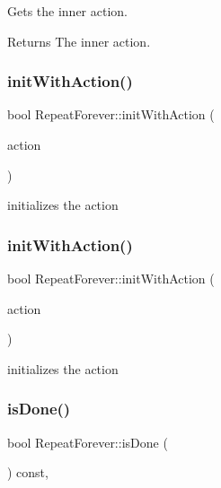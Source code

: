 Gets the inner action.

\begin{DoxyReturn}{Returns}
The inner action. 
\end{DoxyReturn}
\mbox{\label{classRepeatForever_a43be589f168fffe1fb2868ab92c44c5d}} 
\subsubsection{\texorpdfstring{init\+With\+Action()}{initWithAction()}\hspace{0.1cm}{\footnotesize\ttfamily [1/2]}}
{\footnotesize\ttfamily bool Repeat\+Forever\+::init\+With\+Action (\begin{DoxyParamCaption}\item[{\hyperlink{classActionInterval}{Action\+Interval} $\ast$}]{action }\end{DoxyParamCaption})}

initializes the action \mbox{\label{classRepeatForever_a43be589f168fffe1fb2868ab92c44c5d}} 
\subsubsection{\texorpdfstring{init\+With\+Action()}{initWithAction()}\hspace{0.1cm}{\footnotesize\ttfamily [2/2]}}
{\footnotesize\ttfamily bool Repeat\+Forever\+::init\+With\+Action (\begin{DoxyParamCaption}\item[{\hyperlink{classActionInterval}{Action\+Interval} $\ast$}]{action }\end{DoxyParamCaption})}

initializes the action \mbox{\label{classRepeatForever_a373f8961c015a1afa61c293ce787382c}} 
\subsubsection{\texorpdfstring{is\+Done()}{isDone()}\hspace{0.1cm}{\footnotesize\ttfamily [1/2]}}
{\footnotesize\ttfamily bool Repeat\+Forever\+::is\+Done (\begin{DoxyParamCaption}\item[{void}]{ }\end{DoxyParamCaption}) const\hspace{0.3cm}{\ttfamily [override]}, {\ttfamily [virtual]}}

